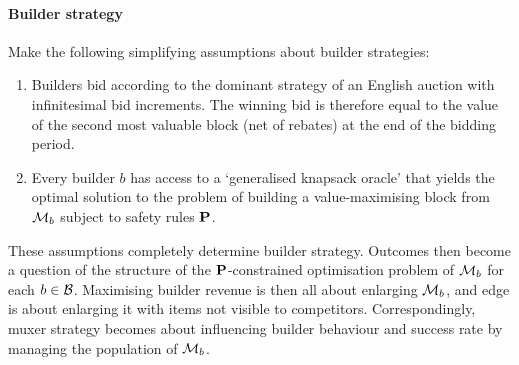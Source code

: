     

\paragraph{Builder strategy}
%
Make the following simplifying assumptions about builder strategies:
%
\begin{enumerate}
  \item
    Builders bid according to the dominant strategy of an English auction with infinitesimal bid increments.
    The winning bid is therefore equal to the value of the second most valuable block (net of rebates) at the end of the bidding period.

  \item
    Every builder $b$ has access to a `generalised knapsack oracle' that yields the optimal solution to the problem of building a value-maximising block from $\mathcal{M}_b$ subject to safety rules $\mathbf{P}$.
\end{enumerate}
%
These assumptions completely determine builder strategy.
%
Outcomes then become a question of the structure of the $\mathbf{P}$-constrained optimisation problem of $\mathcal{M}_b$ for each $b\in\mathcal{B}$.
%
Maximising builder revenue is then all about enlarging $\mathcal{M}_b$, and edge is about enlarging it with items not visible to competitors.
%
Correspondingly, muxer strategy becomes about influencing builder behaviour and success rate by managing the population of $\mathcal{M}_b$.

